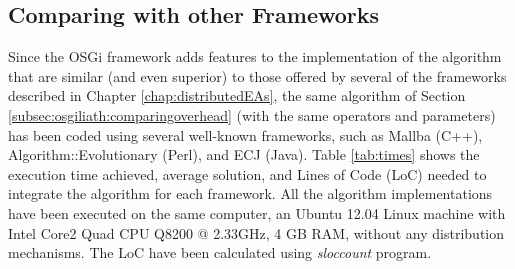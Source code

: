 \subsection{Comparing with other Frameworks}
Since the OSGi framework adds features to the implementation of the
algorithm that are similar (and even superior) to those offered by
several of the frameworks described in Chapter
\ref{chap:distributedEAs}, the same algorithm of Section \ref{subsec:osgiliath:comparingoverhead} (with the same operators
and parameters) has been coded using several well-known frameworks, such as Mallba (C++), Algorithm::Evolutionary (Perl), and ECJ (Java). %
Table \ref{tab:times} shows the execution time achieved, average 
solution, and Lines of Code (LoC) needed to integrate the algorithm
for each framework. All the algorithm implementations have been
executed on the same computer, an Ubuntu 12.04 Linux machine with
Intel Core2 Quad CPU Q8200 @ 2.33GHz, 4 GB RAM, without any
distribution mechanisms. The LoC have been calculated using {\em
  sloccount} program. 






\begin{table}
\caption{Comparison of tested EA frameworks in time and development.}
\label{tab:times}
\end{table}

